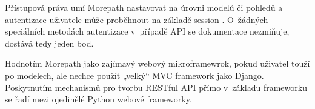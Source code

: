Přístupová práva umí Morepath nastavovat na úrovni modelů či pohledů a autentizace uživatele může proběhnout na základě session \autocite{morepathauth}. O~žádných speciálních metodách autentizace v~případě API se dokumentace nezmiňuje, dostává tedy jeden bod.

Hodnotím Morepath jako zajímavý webový mikroframewrok, pokud uživatel touží po modelech, ale nechce použít „velký“ MVC framework jako Django. Poskytnutím mechanismů pro tvorbu RESTful API přímo v~základu frameworku se řadí mezi ojedinělé Python webové frameworky.
